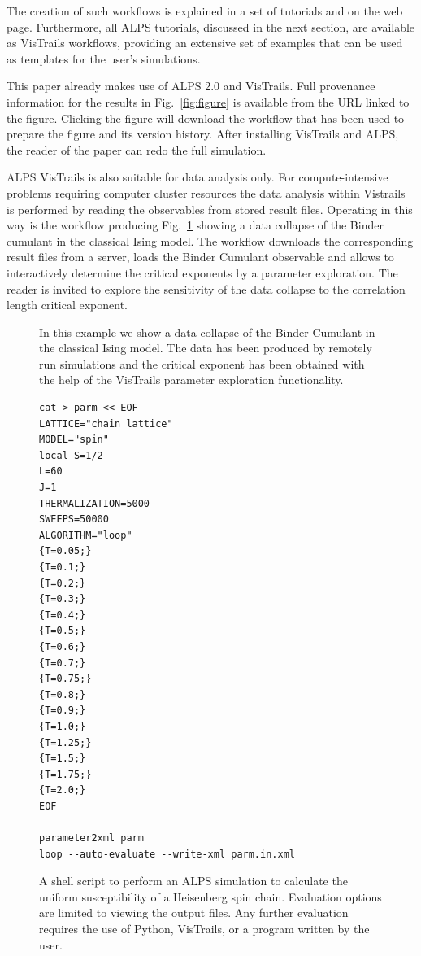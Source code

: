 \documentclass[12pt]{iopart}
\begin{document}
The creation of such workflows is explained in a set of tutorials and on the web page. Furthermore, all ALPS tutorials, discussed in the next section, are available as VisTrails workflows, providing an extensive set of examples that can be used as templates for the user's simulations. 

This paper already makes use of ALPS 2.0 and VisTrails. Full provenance information for the results in Fig.~\ref{fig:figure} is available from the URL linked to the figure. Clicking the figure will download the workflow that has been used to prepare the figure and its version history. After installing VisTrails and ALPS, the reader of the paper can redo the full simulation.

ALPS VisTrails is also suitable for data analysis only. For compute-intensive problems requiring computer cluster resources the data analysis within Vistrails is performed by reading the observables from stored result files. Operating in this way is the workflow producing Fig.~\ref{fig:datacollapse} showing a data collapse of the Binder cumulant in the classical Ising model. The workflow downloads the corresponding result files from a server, loads the Binder Cumulant observable and allows to interactively determine the critical exponents by a parameter exploration. The reader is invited to explore the sensitivity of the data collapse to the correlation length critical exponent.
\begin{figure}[t]
\caption{In this example we show a data collapse of the Binder Cumulant in the classical Ising model. The data has been produced by remotely run simulations and the critical exponent has been obtained with the help of the VisTrails parameter exploration functionality.}
\label{fig:datacollapse}
\end{figure}

\begin{figure}[t]
\begin{multicols}{2}
\begin{lstlisting}
cat > parm << EOF
LATTICE="chain lattice"
MODEL="spin"
local_S=1/2
L=60
J=1
THERMALIZATION=5000
SWEEPS=50000
ALGORITHM="loop"
{T=0.05;}
{T=0.1;}
{T=0.2;}
{T=0.3;}
{T=0.4;}
{T=0.5;}
{T=0.6;}
{T=0.7;}
{T=0.75;}
{T=0.8;}
{T=0.9;}
{T=1.0;}
{T=1.25;}
{T=1.5;}
{T=1.75;}
{T=2.0;}
EOF

parameter2xml parm
loop --auto-evaluate --write-xml parm.in.xml
\end{lstlisting}
\end{multicols}
\caption{A shell script to perform an ALPS simulation to calculate the uniform susceptibility of a Heisenberg spin chain. Evaluation options are limited to viewing the output files. Any further evaluation requires the use of Python, VisTrails, or a program written by the user.}
\label{fig:commandline}
\end{figure}
\end{document}
